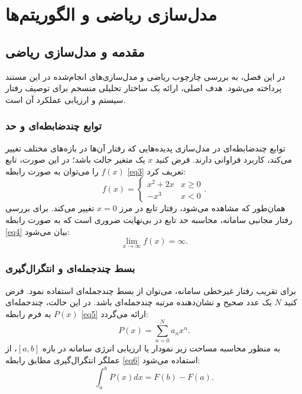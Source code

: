 \chapter{مدل‌سازی ریاضی و الگوریتم‌ها}\label{chap:2}

\section{مقدمه و مدل‌سازی ریاضی}\label{sec:2-1}
در این فصل، به بررسی چارچوب ریاضی و مدل‌سازی‌های انجام‌شده در این مستند پرداخته می‌شود. هدف اصلی، ارائه یک ساختار تحلیلی منسجم برای توصیف رفتار سیستم و ارزیابی عملکرد آن است. 

\subsection{توابع چندضابطه‌ای و حد}\label{subsec:2-1-1}
توابع چندضابطه‌ای در مدل‌سازی پدیده‌هایی که رفتار آن‌ها در بازه‌های مختلف تغییر می‌کند، کاربرد فراوانی دارند. فرض کنید $ x $ یک متغیر حالت باشد؛ در این صورت، تابع $ f(x) $ را می‌توان به صورت رابطه \eqref{eq3} تعریف کرد:
\begin{equation}
	\label{eq3}
	f(x) =
	\begin{cases}
		x^2 + 2x & x \geq 0 \\
		-x^3 & x < 0
	\end{cases}.
\end{equation}
همان‌طور که مشاهده می‌شود، رفتار تابع در مرز $ x = 0 $ تغییر می‌کند. برای بررسی رفتار مجانبی سامانه، محاسبه حد تابع در بی‌نهایت ضروری است که به صورت رابطه \eqref{eq4} بیان می‌شود:
\begin{equation}
	\label{eq4}
	\lim_{x \rightarrow \infty} f(x) = \infty.
\end{equation}

\subsection{بسط چندجمله‌ای و انتگرال‌گیری}\label{subsec:2-1-2}
برای تقریب رفتار غیرخطی سامانه، می‌توان از بسط چندجمله‌ای استفاده نمود. فرض کنید $ N $ یک عدد صحیح و نشان‌دهنده مرتبه چندجمله‌ای باشد. در این حالت، چندجمله‌ای $ P(x) $ به فرم رابطه \eqref{eq5} ارائه می‌گردد:
\begin{equation}
	\label{eq5}
	P(x) = \sum_{n=0}^{N} a_n x^n.
\end{equation}
به منظور محاسبه مساحت زیر نمودار یا ارزیابی انرژی سامانه در بازه $ [a, b] $، از عملگر انتگرال‌گیری مطابق رابطه \eqref{eq6} استفاده می‌شود:
\begin{equation}
	\label{eq6}
	\int_{a}^{b} P(x) dx = F(b) - F(a).
\end{equation}


